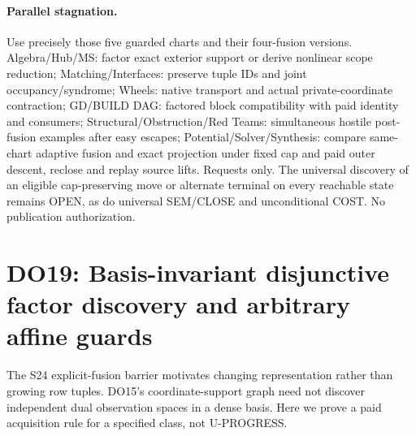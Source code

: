 \documentclass[11pt]{article}
\begin{document}
\paragraph{Parallel stagnation.} Use precisely those five guarded charts and their four-fusion versions. Algebra/Hub/MS: factor exact exterior support or derive nonlinear scope reduction; Matching/Interfaces: preserve tuple IDs and joint occupancy/syndrome; Wheels: native transport and actual private-coordinate contraction; GD/BUILD DAG: factored block compatibility with paid identity and consumers; Structural/Obstruction/Red Teams: simultaneous hostile post-fusion examples after easy escapes; Potential/Solver/Synthesis: compare same-chart adaptive fusion and exact projection under fixed cap and paid outer descent, reclose and replay source lifts. Requests only. The universal discovery of an eligible cap-preserving move or alternate terminal on every reachable state remains OPEN, as do universal SEM/CLOSE and unconditional COST. No publication authorization.


\section{DO19: Basis-invariant disjunctive factor discovery and arbitrary affine guards}\label{sec:do19}
The S24 explicit-fusion barrier motivates changing representation rather than growing row tuples. DO15's coordinate-support graph need not discover independent dual observation spaces in a dense basis. Here we prove a paid acquisition rule for a specified class, not U-PROGRESS.
\end{document}
